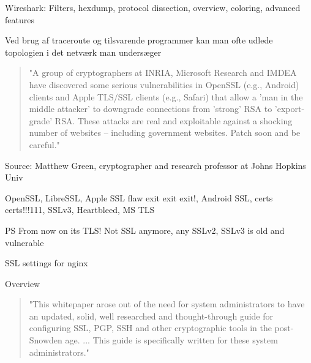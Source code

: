 \documentclass[20pt,landscape,a4paper]{foils}
\begin{document}
Wireshark: Filters, hexdump, protocol dissection, overview, coloring, advanced features





\begin{list1}
\item Ved brug af traceroute og tilsvarende programmer kan man ofte
  udlede topologien i det netværk man undersæger
\end{list1}










\begin{quote}
"A group of cryptographers at INRIA, Microsoft Research and IMDEA have discovered some serious vulnerabilities in OpenSSL (e.g., Android) clients and Apple TLS/SSL clients (e.g., Safari) that allow a 'man in the middle attacker' to downgrade connections from 'strong' RSA to 'export-grade' RSA. These attacks are real and exploitable against a shocking number of websites -- including government websites. Patch soon and be careful."
\end{quote}

Source: Matthew Green, cryptographer and research professor at Johns Hopkins Univ\\
{\tiny{}
 
}


OpenSSL, LibreSSL, Apple SSL flaw exit exit exit!, Android SSL, certs certs!!!111, SSLv3, Heartbleed, MS TLS




\vskip 1cm
PS From now on its TLS! Not SSL anymore, any SSLv2, SSLv3 is old and vulnerable



SSL settings for nginx

Overview
\begin{quote}
"This whitepaper arose out of the need for system administrators to have an updated,
solid, well researched and thought-through guide for configuring SSL, PGP, SSH and
other cryptographic tools in the post-Snowden age. ... This guide is specifically
written for these system administrators."
\end{quote}
\end{document}

